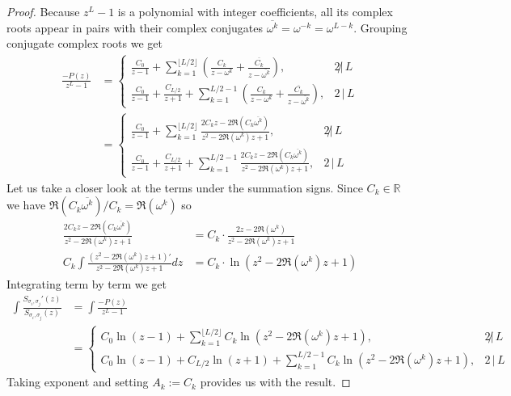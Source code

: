 \documentclass[10pt,a4paper]{amsart}
\theoremstyle{plain}
\theoremstyle{definition}
\theoremstyle{remark}
\def\R{\mathbb{R}}
\begin{document}
\begin{proof}
  Because $z^L-1$ is a polynomial with integer coefficients, all its complex roots appear in pairs
  with their complex conjugates $\overline{\omega^k} = \omega^{-k} = \omega^{L-k}$.
  Grouping conjugate complex roots we get
  \begin{align*}
    \frac{-P(z)}{z^L-1} &= \begin{cases}
      \frac{C_0}{z-1} + \sum_{k=1}^{\lfloor L/2 \rfloor} \left( \frac{C_k}{z-\omega^k} + \frac{\overline{C_k}}{z-\overline{\omega^k}} \right), & 2 \!\not|\, L \\[2ex]
      \frac{C_0}{z-1} + \frac{C_{L/2}}{z+1} + \sum_{k=1}^{L/2-1} \left( \frac{C_k}{z-\omega^k} + \frac{\overline{C_k}}{z-\overline{\omega^k}} \right), & 2 \,|\, L
    \end{cases} \\[2ex]
    &= \begin{cases}
      \frac{C_0}{z-1} + \sum_{k=1}^{\lfloor L/2 \rfloor} \frac{2C_kz-2\Re(C_k\overline{\omega^k})}{z^2-2\Re(\omega^k)z+1}, & 2 \!\not|\, L \\[2ex]
      \frac{C_0}{z-1} + \frac{C_{L/2}}{z+1} + \sum_{k=1}^{L/2-1} \frac{2C_kz-2\Re(C_k\overline{\omega^k})}{z^2-2\Re(\omega^k)z+1}, & 2 \,|\, L
    \end{cases}
  \end{align*}
  Let us take a closer look at the terms under the summation signs.
  Since $C_k \in \R$ we have $\Re(C_k\overline{\omega^k})/C_k = \Re(\omega^k)$
  so
  \begin{align*}
    \frac{2C_kz-2\Re(C_k\overline{\omega^k})}{z^2-2\Re(\omega^k)z+1}
      &= C_k \cdot \frac{2z-2\Re(\omega^k)}{z^2 -2\Re(\omega^k)z +1} \\
    C_k \int \frac{\left( z^2 -2\Re(\omega^k)z +1 \right)'}{z^2-2\Re(\omega^k)z+1} dz
      &= C_k \cdot \ln \left( z^2-2\Re(\omega^k)z+1 \right)
  \end{align*}
  Integrating term by term we get
  \begin{align*}
    \int \frac{S_{\sigma_i, \sigma_j}'(z)}{S_{\sigma_i, \sigma_j}(z)}
      &= \int \frac{-P(z)}{z^L-1} \\
    &= \begin{cases}
      C_0\ln(z-1) + \sum_{k=1}^{\lfloor L/2 \rfloor} C_k \ln \left( z^2-2\Re(\omega^k)z+1 \right)  , & 2 \!\not|\, L \\[2ex]
       C_0\ln(z-1) + C_{L/2}\ln(z+1) + \sum_{k=1}^{L/2-1} C_k \ln \left( z^2-2\Re(\omega^k)z+1 \right) , & 2 \,|\, L
    \end{cases}
  \end{align*}
  Taking exponent and setting $A_k := C_k$ provides us with the result.
\end{proof}
\end{document}
